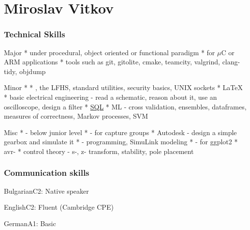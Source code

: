 \documentclass{tccv}
\begin{document}


\part{Miroslav Vitkov}


\section{Technical Skills}
\begin{factlist}
\item{Major}
{
     *  under procedural, object oriented or functional paradigm  \mynext
     *  for $\mu$C or ARM applications  \mynext
     * tools such as git, gitolite, cmake, teamcity, valgrind, clang-tidy, objdump
}
\\
\item{Minor}
{
    *   \mynext
    * , the LFHS, standard utilities, security basics, UNIX sockets  \mynext
    * \LaTeX  \mynext
    * basic electrical engineering - read a schematic, reason about it, use an oscilloscope, design a filter  \mynext
    * {\href{https://github.com/MiroslavVitkov/scripts/tree/master/db/init.sh}{SQL}}  \mynext
    * ML - cross validation, ensembles, dataframes, measures of correctness, Markov processes, SVM
}
\\
\item{Misc}
{
    *  - below junior level  \mynext
    *  - for capture groups  \mynext
    * Autodesk  - design a simple gearbox and simulate it  \mynext
    *  - programming, SimuLink modeling  \mynext
    *  - for ggplot2  \mynext
    * avr-  \mynext
    * control theory - s-, z- transform, stability, pole placement
}
\end{factlist}


\section{Communication skills}
\begin{factlist}
\item{Bulgarian}{C2: Native speaker}
\item{English}{C2: Fluent (Cambridge CPE)}
\item{German}{A1: Basic}
\end{factlist}
\end{document}
